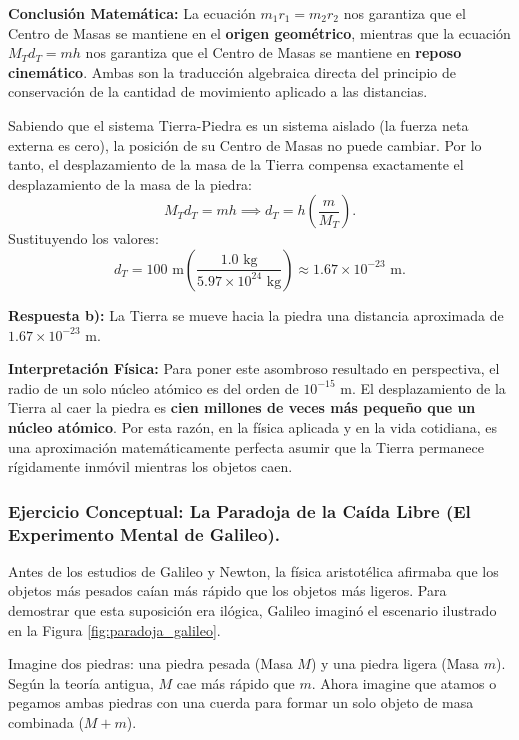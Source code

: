 \documentclass[11pt,a4paper]{book}
\begin{document}
\textbf{Conclusión Matemática:}
La ecuación $m_1 r_1 = m_2 r_2$ nos garantiza que el Centro de Masas se mantiene en el \textbf{origen geométrico}, mientras que la ecuación $M_T d_T = m h$ nos garantiza que el Centro de Masas se mantiene en \textbf{reposo cinemático}. Ambas son la traducción algebraica directa del principio de conservación de la cantidad de movimiento aplicado a las distancias.


Sabiendo que el sistema Tierra-Piedra es un sistema aislado (la fuerza neta externa es cero), la posición de su Centro de Masas no puede cambiar. Por lo tanto, el desplazamiento de la masa de la Tierra compensa exactamente el desplazamiento de la masa de la piedra:
\begin{equation}
    M_T d_T = m h \implies d_T = h \left( \frac{m}{M_T} \right).
\end{equation}
Sustituyendo los valores:
\begin{equation}
    d_T = 100 \text{ m} \left( \frac{1.0 \text{ kg}}{5.97 \times 10^{24} \text{ kg}} \right) \approx 1.67 \times 10^{-23} \text{ m}.
\end{equation}

\textbf{Respuesta b):} La Tierra se mueve hacia la piedra una distancia aproximada de $1.67 \times 10^{-23} \text{ m}$.

\textbf{Interpretación Física:}
Para poner este asombroso resultado en perspectiva, el radio de un solo núcleo atómico es del orden de $10^{-15} \text{ m}$. El desplazamiento de la Tierra al caer la piedra es \textbf{cien millones de veces más pequeño que un núcleo atómico}. Por esta razón, en la física aplicada y en la vida cotidiana, es una aproximación matemáticamente perfecta asumir que la Tierra permanece rígidamente inmóvil mientras los objetos caen.

\subsubsection{Ejercicio Conceptual: La Paradoja de la Caída Libre (El Experimento Mental de Galileo).}
    
    Antes de los estudios de Galileo y Newton, la física aristotélica afirmaba que los objetos más pesados caían más rápido que los objetos más ligeros. Para demostrar que esta suposición era ilógica, Galileo imaginó el escenario ilustrado en la Figura \ref{fig:paradoja_galileo}.
    
    Imagine dos piedras: una piedra pesada (Masa $M$) y una piedra ligera (Masa $m$). Según la teoría antigua, $M$ cae más rápido que $m$. Ahora imagine que atamos o pegamos ambas piedras con una cuerda para formar un solo objeto de masa combinada ($M + m$).
    
\end{document}
